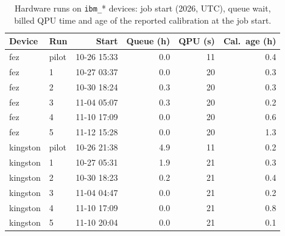 \begin{table}[t]
\centering
\caption{Hardware runs on \texttt{ibm\_}* devices: job start (2026, UTC), queue wait, billed QPU time and age of the reported calibration at the job start.}
\label{tab:protocol}
\footnotesize
\setlength{\tabcolsep}{3.5pt}
\begin{tabular}{llrrrr}
\toprule
Device & Run & Start & Queue (h) & QPU (s) & Cal.\ age (h) \\
\midrule
fez & pilot & 10-26 15:33 & 0.0 & 11 & 0.4 \\
fez & 1 & 10-27 03:37 & 0.0 & 20 & 0.3 \\
fez & 2 & 10-30 18:24 & 0.3 & 20 & 0.3 \\
fez & 3 & 11-04 05:07 & 0.3 & 20 & 0.2 \\
fez & 4 & 11-10 17:09 & 0.0 & 20 & 0.6 \\
fez & 5 & 11-12 15:28 & 0.0 & 20 & 1.3 \\
kingston & pilot & 10-26 21:38 & 4.9 & 11 & 0.2 \\
kingston & 1 & 10-27 05:31 & 1.9 & 21 & 0.3 \\
kingston & 2 & 10-30 18:23 & 0.2 & 21 & 0.4 \\
kingston & 3 & 11-04 04:47 & 0.0 & 21 & 0.2 \\
kingston & 4 & 11-10 17:09 & 0.0 & 21 & 0.8 \\
kingston & 5 & 11-10 20:04 & 0.0 & 21 & 0.1 \\
\bottomrule
\end{tabular}
\end{table}
